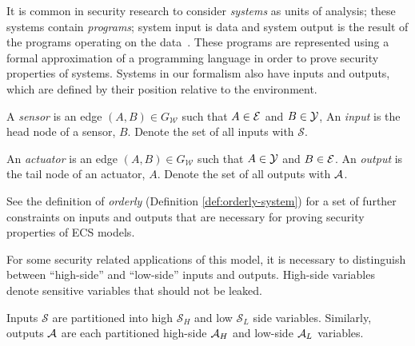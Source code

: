 \documentclass[../thesis.tex]{subfiles}
\newcommand{\W}{\mathcal{W}} %
\begin{document}
It is common in security research to consider \emph{systems}
as units of analysis; these systems contain \emph{programs}; system
input is data and system output is the result of the programs
operating on the data~\cite{mclean90sp}.
These programs are represented using a formal approximation of a
programming language
in order to prove security properties of systems.
Systems in our formalism also have inputs and outputs,
which are defined by their position relative
to the environment.

\begin{dfn}
  A \emph{sensor} is an edge $(A,B) \in G_\W$
  such that $A \in \mathcal{E}$ and $B \in \mathcal{Y}$,
  An \emph{input} is the head node of a sensor, $B$.
  Denote the set of all inputs with $\mathcal{S}$.
\end{dfn}

%
%

\begin{dfn}
  An \emph{actuator} is an edge $(A,B) \in G_\W$ such
  that $A \in \mathcal{Y}$ and $B \in \mathcal{E}$.
  An \emph{output} is the tail node of an actuator, $A$.
  Denote the set of all outputs with $\mathcal{A}$.
\end{dfn}

\begin{center}
\end{center}

See the definition of \emph{orderly} (Definition \ref{def:orderly-system})
for a set of further constraints on inputs and outputs
that are necessary for proving security properties of ECS models.

For some security related applications of this model,
it is necessary to distinguish between ``high-side''
and ``low-side'' inputs and outputs.
High-side variables denote sensitive variables
that should not be leaked.

\begin{dfn}
  Inputs $\mathcal{S}$ are partitioned into high $\mathcal{S}_H$
  and low $\mathcal{S}_L$ side variables.
  Similarly, outputs $\mathcal{A}$ are each partitioned
  high-side $\mathcal{A}_H$ and low-side $\mathcal{A}_L$ variables.
\end{dfn}
\end{document}
